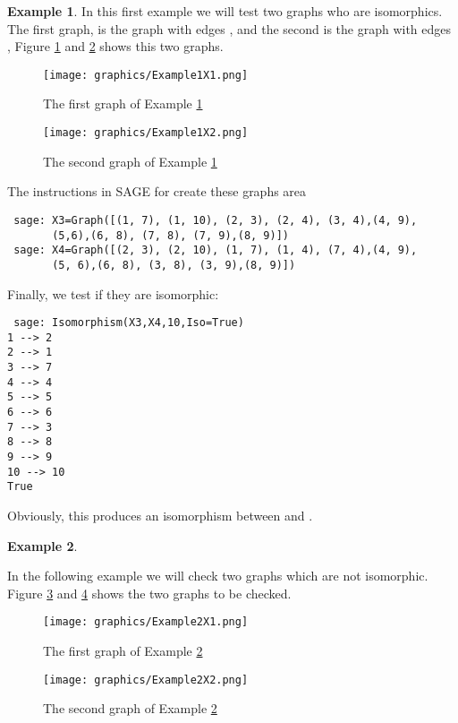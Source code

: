 \documentclass[12pt,a4paper]{book}
\theoremstyle{plain}
\theoremstyle{definition}
\newtheorem{example}{Example}
\theoremstyle{remark}
\begin{document}
\begin{center}
 \begin{example}\label{ImpTestEx1}
  In this first example we will test two graphs who are isomorphics. The first graph, is the graph with edges  , and the second is the graph with edges  , Figure \ref{Example1X1} and \ref{Example1X2} shows this two graphs.

  \begin{figure}
\centering
 \texttt{[image: graphics/Example1X1.png]}
 \caption{The first graph of Example \ref{ImpTestEx1}}\label{Example1X1}
\end{figure}

\begin{figure}
\centering
\texttt{[image: graphics/Example1X2.png]}
 \caption{The second graph of Example \ref{ImpTestEx1}}\label{Example1X2}
\end{figure}

The instructions in SAGE for create these graphs area

\begin{verbatim}
 sage: X3=Graph([(1, 7), (1, 10), (2, 3), (2, 4), (3, 4),(4, 9), 
       (5,6),(6, 8), (7, 8), (7, 9),(8, 9)])
 sage: X4=Graph([(2, 3), (2, 10), (1, 7), (1, 4), (7, 4),(4, 9), 
       (5, 6),(6, 8), (3, 8), (3, 9),(8, 9)])
\end{verbatim}

Finally, we test if they are isomorphic: 

\begin{verbatim}
 sage: Isomorphism(X3,X4,10,Iso=True)
1 --> 2
2 --> 1
3 --> 7
4 --> 4
5 --> 5
6 --> 6
7 --> 3
8 --> 8
9 --> 9
10 --> 10
True
\end{verbatim}

Obviously, this produces  an isomorphism between  and .
\end{example}

\begin{example}\label{ImpTestEx2}

In the following  example we will check two graphs which  are not isomorphic. Figure \ref{Example2X1} and \ref{Example2X2} shows the two graphs 
 to be checked.
\begin{figure}
\centering
 \texttt{[image: graphics/Example2X1.png]}
 \caption{The first graph of Example \ref{ImpTestEx2}}\label{Example2X1}
\end{figure}

\begin{figure}
\centering
\texttt{[image: graphics/Example2X2.png]}
 \caption{The second graph of Example \ref{ImpTestEx2}}\label{Example2X2}
\end{figure}


\end{example}
\end{center}
\end{document}
